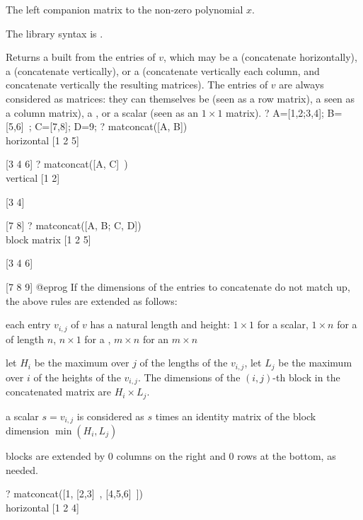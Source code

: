 \label{se:matcompanion}
The left companion matrix to the non-zero polynomial $x$.

The library syntax is .

\label{se:matconcat}
Returns a  built from the entries of $v$, which may
be a  (concatenate horizontally), a  (concatenate
vertically), or a  (concatenate vertically each column, and
concatenate vertically the resulting matrices). The entries of $v$ are always
considered as matrices: they can themselves be  (seen as a row
matrix), a  seen as a column matrix), a , or a scalar (seen
as an $1 \times 1$ matrix).
\bprog
? A=[1,2;3,4]; B=[5,6]~; C=[7,8]; D=9;
? matconcat([A, B]) \\ horizontal
[1 2 5]

[3 4 6]
? matconcat([A, C]~) \\ vertical
[1 2]

[3 4]

[7 8]
? matconcat([A, B; C, D]) \\ block matrix
[1 2 5]

[3 4 6]

[7 8 9]
@eprog\noindent
If the dimensions of the entries to concatenate do not match up, the above
rules are extended as follows:

\item each entry $v_{i,j}$ of $v$ has a natural length and height: $1 \times
1$ for a scalar, $1 \times n$ for a  of length $n$, $n \times 1$
for a , $m \times n$ for an $m\times n$ 

\item let $H_i$ be the maximum over $j$ of the lengths of the $v_{i,j}$,
let $L_j$ be the maximum over $i$ of the heights of the $v_{i,j}$.
The dimensions of the $(i,j)$-th block in the concatenated matrix are
$H_i \times L_j$.

\item a scalar $s = v_{i,j}$ is considered as $s$ times an identity matrix
of the block dimension $\min (H_i,L_j)$

\item blocks are extended by 0 columns on the right and 0 rows at the
bottom, as needed.

\bprog
? matconcat([1, [2,3]~, [4,5,6]~]) \\ horizontal
[1 2 4]

